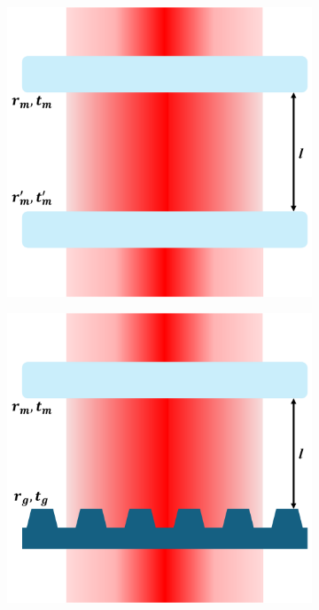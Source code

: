 \begin{figure}[h!]
    \centering
    \begin{subfigure}[b]{0.3\textwidth}
        \includegraphics[width=\textwidth]{figures/broadband_sketch.pdf}
        \caption{}
        \label{fig:broadband_sketch}
    \end{subfigure}
    \hspace{1cm}
    \begin{subfigure}[b]{0.3\textwidth}
        \includegraphics[width=\textwidth]{figures/single_fano_sketch.pdf}

\end{subfigure}
\end{figure}
